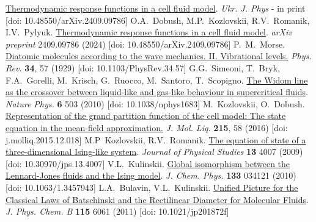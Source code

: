 \begin{thebibliography}{99}
	\href{https://doi.org/10.48550/arXiv.2409.09786}{Thermodynamic response functions in a cell fluid model}. \textit{Ukr. J. Phys} - in print [doi: 10.48550/arXiv.2409.09786]
	 O.A.~Dobush, M.P.~Kozlovskii, R.V.~Romanik, I.V.~Pylyuk.
	\href{https://doi.org/10.48550/arXiv.2409.09786}{Thermodynamic response functions in a cell fluid model}. \textit{arXiv preprint} 2409.09786 (2024) [doi: 10.48550/arXiv.2409.09786]
	 P.~M.~Morse. 
	\href{https://link.aps.org/doi/10.1103/PhysRev.34.57}{Diatomic molecules according to the wave mechanics. II. Vibrational levels.} \textit{Phys. Rev.} \textbf{34}, 57 (1929) [doi: 10.1103/PhysRev.34.57]
	 G.G.~Simeoni, T.~Bryk, F.A.~Gorelli, M.~Krisch, G.~Ruocco, M.~Santoro, T.~Scopigno.
	\href{https://doi.org/10.1038/nphys1683}{ The Widom line as the crossover between liquid-like and gas-like behaviour in supercritical fluids}. \textit{Nature Phys.} \textbf{6} 503 (2010) [doi: 10.1038/nphys1683]
	 M.~Kozlovskii, O.~Dobush.
	\href{https://doi.org/j.molliq.2015.12.018}{Representation of the grand partition function of the cell model: The state equation in the mean-field approximation.} \textit{J. Mol. Liq.} \textbf{215}, 58 (2016) [doi: j.molliq.2015.12.018]
	 M.P~Kozlovskii, R.V.~Romanik.
	\href{https://doi.org/10.30970/jps.13.4007}{The equation of state of a three-dimensional {Ising}-like system}. \textit{Journal of Physical Studies} \textbf{13} 4007 (2009) [doi: 10.30970/jps.13.4007]
	 V.L.~Kulinskii.
	\href{https://doi.org/10.1063/1.3457943}{Global isomorphism between the {Lennard-Jones} fluids and the {Ising} model}. \textit{J. Chem. Phys.} \textbf{133} 034121 (2010) [doi: 10.1063/1.3457943]
	 L.A.~Bulavin, V.L.~Kulinskii.
	\href{https://doi.org/10.1021/jp201872f}{Unified Picture for the Classical Laws of {B}atschinski and the Rectilinear Diameter for Molecular Fluids}. \textit{J. Phys. Chem. B} \textbf{115} 6061 (2011) [doi: 10.1021/jp201872f]
	
\end{thebibliography}